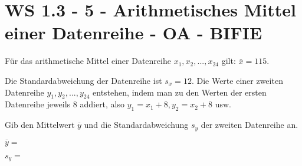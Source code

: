 \section{WS 1.3 - 5 - Arithmetisches Mittel einer Datenreihe - OA - BIFIE}

\begin{beispiel}[WS 1.3]{1} %
				Für das arithmetische Mittel einer Datenreihe $x_{1},x_{2},...,x_{24}$ gilt: $\overline{x}=115$.

Die Standardabweichung der Datenreihe ist $s_{x}=12$. Die Werte einer zweiten Datenreihe $y_{1},y_{2},...,y_{24}$ entstehen, indem man zu den Werten der ersten Datenreihe jeweils 8 addiert, also $y_{1}=x_{1}+8,y_{2}=x_{2}+8$ usw.

Gib den Mittelwert $\overline{y}$ und die Standardabweichung $s_{y}$ der zweiten Datenreihe an.

$\overline{y}=$

$s_{y}=$


				\end{beispiel}